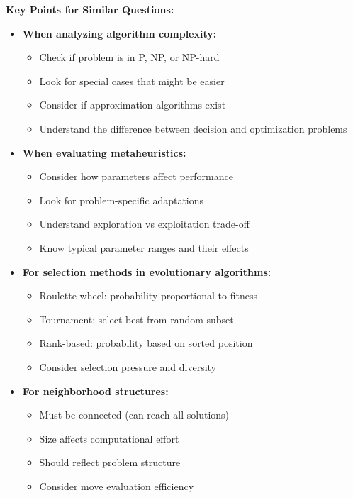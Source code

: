 \textbf{Key Points for Similar Questions:}
\begin{itemize}
\item \textbf{When analyzing algorithm complexity:}
  \begin{itemize}
  \item Check if problem is in P, NP, or NP-hard
  \item Look for special cases that might be easier
  \item Consider if approximation algorithms exist
  \item Understand the difference between decision and optimization problems
  \end{itemize}

\item \textbf{When evaluating metaheuristics:}
  \begin{itemize}
  \item Consider how parameters affect performance
  \item Look for problem-specific adaptations
  \item Understand exploration vs exploitation trade-off
  \item Know typical parameter ranges and their effects
  \end{itemize}

\item \textbf{For selection methods in evolutionary algorithms:}
  \begin{itemize}
  \item Roulette wheel: probability proportional to fitness
  \item Tournament: select best from random subset
  \item Rank-based: probability based on sorted position
  \item Consider selection pressure and diversity
  \end{itemize}

\item \textbf{For neighborhood structures:}
  \begin{itemize}
  \item Must be connected (can reach all solutions)
  \item Size affects computational effort
  \item Should reflect problem structure
  \item Consider move evaluation efficiency
  \end{itemize}
\end{itemize}

